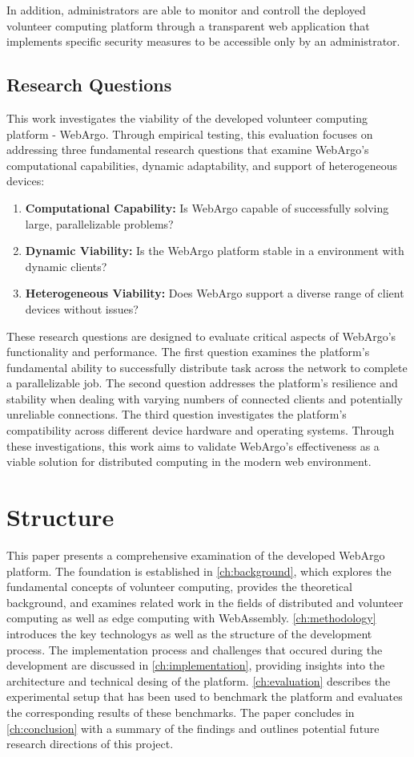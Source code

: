 In addition, administrators are able to monitor and controll the deployed volunteer computing platform through a transparent web application that implements specific security measures to be accessible only by an administrator.

\subsection{Research Questions}
\label{subsec:into:objectives:questions}
This work investigates the viability of the developed volunteer computing platform - WebArgo. Through empirical testing, this evaluation focuses on addressing three fundamental research questions that examine WebArgo's computational capabilities, dynamic adaptability, and support of heterogeneous devices:
\begin{enumerate}
    \item \textbf{Computational Capability:} Is WebArgo capable of successfully solving large, parallelizable problems?
    \item \textbf{Dynamic Viability:} Is the WebArgo platform stable in a environment with dynamic clients?
    \item \textbf{Heterogeneous Viability:} Does WebArgo support a diverse range of client devices without issues?
\end{enumerate}
These research questions are designed to evaluate critical aspects of WebArgo's functionality and performance. The first question examines the platform's fundamental ability to successfully distribute task across the network to complete a parallelizable job. The second question addresses the platform's resilience and stability when dealing with varying numbers of connected clients and potentially unreliable connections. The third question investigates the platform's compatibility across different device hardware and operating systems. Through these investigations, this work aims to validate WebArgo's effectiveness as a viable solution for distributed computing in the modern web environment.

\section{Structure}
\label{sec:intro:structure}
This paper presents a comprehensive examination of the developed WebArgo platform. The foundation is established in \autoref{ch:background}, which explores the fundamental concepts of volunteer computing, provides the theoretical background, and examines related work in the fields of distributed and volunteer computing as well as edge computing with WebAssembly. \autoref{ch:methodology} introduces the key technologys as well as the structure of the development process. The implementation process and challenges that occured during the development are discussed in \autoref{ch:implementation}, providing insights into the architecture and technical desing of the platform. \autoref{ch:evaluation} describes the experimental setup that has been used to benchmark the platform and evaluates the corresponding results of these benchmarks. The paper concludes in \autoref{ch:conclusion} with a summary of the findings and outlines potential future research directions of this project.